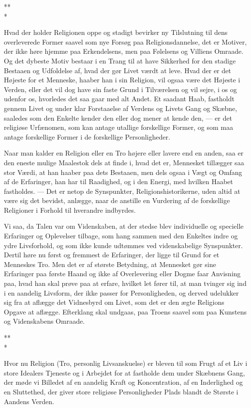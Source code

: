 \documentclass[12pt,a4paper,openany]{book}
\newcommand{\opage}[1]{\marginnote{\footnotesize\textit{[#1]}}}
\newcommand{\stjerner}{\begin{center}*\hspace{0.4em}*\\[-0.9ex]*\end{center}}   %
\begin{document}
\stjerner

Hvad der holder Religionen oppe og stadigt bevirker ny
Tilslutning til dens overleverede Former saavel som nye Forsøg
paa Religionsdannelse, det er Motiver, der ikke høre
hjemme paa Erkendelsens, men paa Følelsens og Villiens Omraade.
Og det dybeste Motiv bestaar i en Trang til at have
Sikkerhed for den stadige Bestaaen og Udfoldelse af, hvad der
gør Livet værdt at leve. Hvad der er det Højeste for et Menneske,
haaber han i sin Religion, vil ogsaa være det Højeste i
Verden, eller det vil dog have sin faste Grund i Tilværelsen
og vil sejre, i os og udenfor os, hvorledes det saa gaar med
\setcounter{footnote}{0}%
\opage{15}alt Andet. Et saadant Haab, fastholdt gennem Livet og under
klar Forstaaelse af Verdens og Livets Gang og Skæbne, saaledes
som den Enkelte kender den eller dog mener at kende
den, --- er det religiøse Urfænomen, som kan antage utallige
forskellige Former, og som maa antage forskellige Former i de
forskellige Personligheder.

Naar man kalder en Religion eller en Tro højere eller
lavere end en anden, saa er den eneste mulige Maalestok dels
at finde i, hvad det er, Mennesket tillægger saa stor Værdi, at
han haaber paa dets Bestaaen, men dels ogsaa i Vægt og Omfang
af de Erfaringer, han har til Raadighed, og i den Energi,
med hvilken Haabet fastholdes. --- Det er netop de Synspunkter,
Religionshistorikerne, uden altid at være sig det bevidst, anlægge,
naar de anstille en Vurdering af de forskellige Religioner
i Forhold til hverandre indbyrdes.

Vi saa, da Talen var om Videnskaben, at der stedse blev
individuelle og specielle Erfaringer og Oplevelser tilbage, som
hang sammen med den Enkeltes indre og ydre Livsforhold, og
som ikke kunde udtømmes ved videnskabelige Synspunkter.
Dertil høre nu først og fremmest de Erfaringer, der ligge til
Grund for et Menneskes Tro. Men det er af største Betydning,
at Mennesket gør sine Erfaringer paa første Haand og
ikke af Overlevering eller Dogme faar Anvisning paa, hvad
han skal prøve paa at erfare, hvilket let fører til, at man
tvinger sig ind i en aandelig Livsform, der ikke passer for
Personligheden, og derved udelukker sig fra at aflægge det
Vidnesbyrd om Livet, som det er den ægte Religions Opgave
at aflægge. Efterklang skal undgaas, paa Troens saavel som
paa Kunstens og Videnskabens Omraade.

\stjerner

Hvor nu Religion (Tro, personlig Livsanskuelse) er bleven
til som Frugt af et Liv i store Idealers Tjeneste og i Arbejdet
for at fastholde dem under Skæbnens Gang, der møde vi Billedet
af en aandelig Kraft og Koncentration, af en Inderlighed
\setcounter{footnote}{0}%
\opage{16}og en Sluttethed, der giver store religiøse Personligheder Plads
blandt de Største i Aandens Verden.
\end{document}
